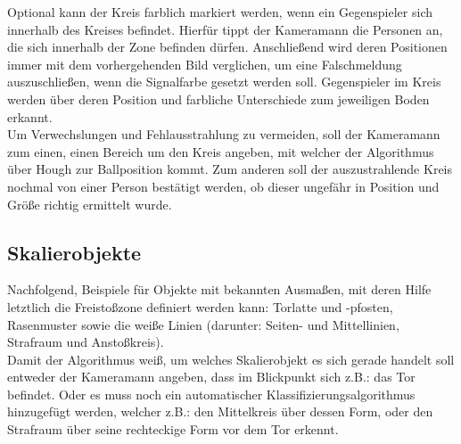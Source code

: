 \documentclass{ezb}
\begin{document}
\linebreak
Optional kann der Kreis farblich markiert werden, wenn ein Gegenspieler sich innerhalb des Kreises befindet. Hierfür tippt der Kameramann die Personen an, die sich innerhalb der Zone befinden dürfen. Anschließend wird deren Positionen immer mit dem vorhergehenden Bild verglichen, um eine Falschmeldung auszuschließen, wenn die Signalfarbe gesetzt werden soll. Gegenspieler im Kreis werden über deren Position und farbliche Unterschiede zum jeweiligen Boden erkannt.\\
\linebreak
Um Verwechslungen und Fehlausstrahlung zu vermeiden, soll der Kameramann zum einen, einen Bereich um den Kreis angeben, mit welcher der Algorithmus über Hough zur Ballposition kommt. Zum anderen soll der auszustrahlende Kreis nochmal von einer Person bestätigt werden, ob dieser ungefähr in Position und Größe richtig ermittelt wurde.
\subsection{Skalierobjekte}\label{b:skaliergr}
Nachfolgend, Beispiele für Objekte mit bekannten Ausmaßen, mit deren Hilfe letztlich die Freistoßzone definiert werden kann: Torlatte und -pfosten, Rasenmuster sowie die weiße Linien (darunter: Seiten- und Mittellinien, Strafraum und Anstoßkreis).\\
\linebreak
Damit der Algorithmus weiß, um welches Skalierobjekt es sich gerade handelt soll entweder der Kameramann angeben, dass im Blickpunkt sich z.B.: das Tor befindet. Oder es muss noch ein automatischer Klassifizierungsalgorithmus hinzugefügt werden, welcher z.B.: den Mittelkreis über dessen Form, oder den Strafraum über seine rechteckige Form vor dem Tor erkennt.
\end{document}

